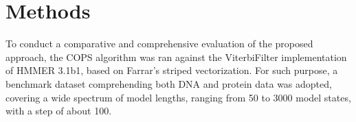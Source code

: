\documentclass{bmcart}
\begin{document}



\section*{Methods}

To conduct a comparative and comprehensive evaluation of the proposed
approach, the \ac{COPS} algorithm was ran against the ViterbiFilter
implementation of HMMER 3.1b1, based on Farrar's striped
vectorization. For such purpose, a benchmark dataset comprehending
both DNA and protein data was adopted, covering a wide spectrum of
model lengths, ranging from 50 to 3000 model states, with a step of
about 100. 
\end{document}

